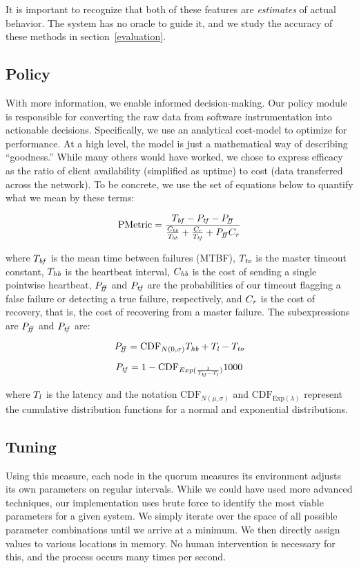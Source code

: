 It is important to recognize that both of these features are \emph{estimates} of actual behavior.
The system has no oracle to guide it, and we study the accuracy of these methods in section~\ref{evaluation}.

\subsection{Policy}
With more information, we enable informed decision-making.
Our policy module is responsible for converting the raw data from software instrumentation into actionable decisions.
Specifically, we use an analytical cost-model to optimize for performance.
At a high level, the model is just a mathematical way of describing ``goodness.''
While many others would have worked, we chose to express efficacy as the ratio of client availability (simplified as uptime) to cost (data transferred across the network).
To be concrete, we use the set of equations below to quantify what we mean by these terms:

\begin{equation}
	\mathrm{PMetric} = \frac%
{	\Tbf - \Ptf - \Pff } %
{	\frac{\Chb}{\Thb} + \frac{\Cr}{\Tbf} + \Pff\Cr } %
\end{equation}

where $T_{\mathit{bf}}$ is the mean time between failures (MTBF), $T_{\mathit{to}}$ is the master timeout constant, $T_{\mathit{hb}}$ is the heartbeat interval, $C_{\mathit{hb}}$ is the cost of sending a single pointwise heartbeat, $P_{\mathit{ff}}$ and $P_{\mathit{tf}}$ are the probabilities of our timeout flagging a false failure or detecting a true failure, respectively, and $C_{\mathit{r}}$ is the cost of recovery, that is, the cost of recovering from a master failure.
The subexpressions are $P_{\mathit{ff}}$ and $P_{\mathit{tf}}$ are:

\begin{equation}
	P_{\mathit{ff}} = \mathrm{CDF}_{N(0,\sigma)} T_{\mathit{hb}} + T_{\mathit{l}} - T_{\mathit{to}}
\end{equation}

\begin{equation}
	P_{\mathit{tf}} = 1-\mathrm{CDF}_{Exp(\frac{1}{T_{\mathit{bf}}-T_{\mathit{l}}})} 1000
\end{equation}

where $T_{\mathit{l}}$ is the latency and the notation $\mathrm{CDF}_{N(\mu,\sigma)}$ and $\mathrm{CDF}_{\mathrm{Exp}(\lambda)}$ represent the cumulative distribution functions for a normal and exponential distributions.

\subsection{Tuning}
Using this measure, each node in the quorum measures its environment adjusts its own parameters on regular intervals.
While we could have used more advanced techniques, our implementation uses brute force to identify the most viable parameters for a given system.
We simply iterate over the space of all possible parameter combinations until we arrive at a minimum.
We then directly assign values to various locations in memory.
No human intervention is necessary for this, and the process occurs many times per second.
